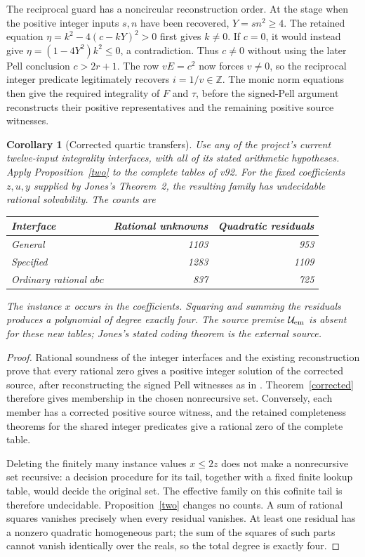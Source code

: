\documentclass[11pt]{article}
\newtheorem{corollary}[theorem]{Corollary}
\newcommand{\Z}{\mathbb Z}\newcommand{\Q}{\mathbb Q}
\begin{document}
The reciprocal guard has a noncircular reconstruction order. At the
stage when the positive integer inputs \(s,n\) have been recovered,
\(Y=sn^2\ge4\). The retained equation
\(\eta=k^2-4(c-kY)^2>0\) first gives \(k\ne0\). If \(c=0\),
it would instead give
\(\eta=(1-4Y^2)k^2\le0\), a contradiction. Thus \(c\ne0\)
without using the later Pell conclusion \(c>2r+1\). The row
\(vE=c^2\) now forces \(v\ne0\), so the reciprocal integer
predicate legitimately recovers \(i=1/v\in\Z\).
The monic norm equations then give the required integrality of
\(F\) and \(\tau\), before the signed-Pell argument reconstructs
their positive representatives and the remaining positive source
witnesses.

\begin{corollary}[Corrected quartic transfers]\label{transfer}
Use any of the project's current twelve-input integrality interfaces,
with all of its stated arithmetic hypotheses. Apply
Proposition~\ref{two} to the complete tables of v92. For the fixed
coefficients \(z,u,y\) supplied by Jones's Theorem~2, the resulting
family has undecidable rational solvability. The counts are
\begin{center}
\begin{tabular}{lrr}
\toprule
Interface & Rational unknowns & Quadratic residuals\\
\midrule
General &1103&953\\
Specified &1283&1109\\
Ordinary rational \(abc\)&837&725\\
\bottomrule
\end{tabular}
\end{center}
The instance \(x\) occurs in the coefficients. Squaring and summing
the residuals produces a polynomial of degree exactly four.
The source premise \(\mathcal U_{\rm em}\) is absent for these
new tables; Jones's stated coding theorem is the external source.
\end{corollary}
\begin{proof}
Rational soundness of the integer interfaces and the existing
reconstruction prove that every rational zero gives a positive
integer solution of the corrected source, after reconstructing the
signed Pell witnesses as in \cite{Pell}. Theorem~\ref{corrected}
therefore gives membership in the chosen nonrecursive set.
Conversely, each member has a corrected positive source witness, and
the retained completeness theorems for the shared integer predicates
give a rational zero of the complete table.

Deleting the finitely many instance values \(x\le2z\) does not
make a nonrecursive set recursive: a decision procedure for its tail,
together with a fixed finite lookup table, would decide the original
set. The effective family on this cofinite tail is therefore
undecidable. Proposition~\ref{two} changes no counts. A sum of
rational squares vanishes precisely when every residual vanishes.
At least one residual has a nonzero quadratic homogeneous part;
the sum of the squares of such parts cannot vanish identically over
the reals, so the total degree is exactly four.
\end{proof}
\end{document}
